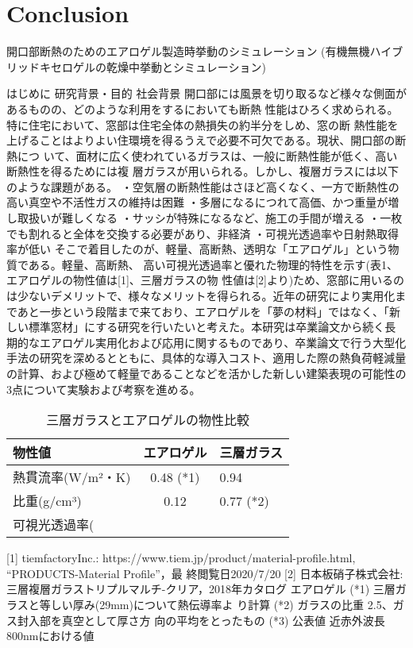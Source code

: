 \documentclass[./main]{subfiles}
\begin{document}
\section{Conclusion}

開口部断熱のためのエアロゲル製造時挙動のシミュレーション
(有機無機ハイブリッドキセロゲルの乾燥中挙動とシミュレーション)

はじめに
	研究背景・目的
		社会背景
			開口部には風景を切り取るなど様々な側面があるものの、どのような利用をするにおいても断熱 性能はひろく求められる。特に住宅において、窓部は住宅全体の熱損失の約半分をしめ、窓の断 熱性能を上げることはよりよい住環境を得るうえで必要不可欠である。現状、開口部の断熱につ いて、面材に広く使われているガラスは、一般に断熱性能が低く、高い断熱性を得るためには複 層ガラスが用いられる。しかし、複層ガラスには以下のような課題がある。 
			・空気層の断熱性能はさほど高くなく、一方で断熱性の高い真空や不活性ガスの維持は困難 
			・多層になるにつれて高価、かつ重量が増し取扱いが難しくなる 
			・サッシが特殊になるなど、施工の手間が増える 
			・一枚でも割れると全体を交換する必要があり、非経済
			・可視光透過率や日射熱取得率が低い
			そこで着目したのが、軽量、高断熱、透明な「エアロゲル」という物質である。軽量、高断熱、 高い可視光透過率と優れた物理的特性を示す(表1、エアロゲルの物性値は[1]、三層ガラスの物 性値は[2]より)ため、窓部に用いるのは少ないデメリットで、様々なメリットを得られる。近年の研究により実用化まであと一歩という段階まで来ており、エアロゲルを「夢の材料」ではなく、「新しい標準窓材」にする研究を行いたいと考えた。本研究は卒業論文から続く長期的なエアロゲル実用化および応用に関するものであり、卒業論文で行う大型化手法の研究を深めるとともに、具体的な導入コスト、適用した際の熱負荷軽減量の計算、および極めて軽量であることなどを活かした新しい建築表現の可能性の3点について実験および考察を進める。
			\begin{table}[hbtp]
				\caption{三層ガラスとエアロゲルの物性比較}
				\label{table:data_type}
				\centering
				\begin{tabular}{lS}
				  \hline
				  物性値  & エアロゲル  &  三層ガラス  \\
				  \hline \hline
				  熱貫流率(W/m²・K)  & 0.48 (*1)  & 0.94 \\
				  比重(g/cm³)  & 0.12   & 0.77 (*2) \\
				  可視光透過率(%
				  \hline
				\end{tabular}
				[1] tiemfactoryInc.: https://www.tiem.jp/product/material-profile.html, “PRODUCTS-Material Profile”，最 終閲覧日2020/7/20
				[2] 日本板硝子株式会社:三層複層ガラストリプルマルチ-クリア，2018年カタログ
				エアロゲル
				(*1) 三層ガラスと等しい厚み(29mm)について熱伝導率よ り計算
				(*2) ガラスの比重 2.5、ガス封入部を真空として厚さ方 向の平均をとったもの
				(*3) 公表値 近赤外波長800nmにおける値
			\end{table}
\end{document}
